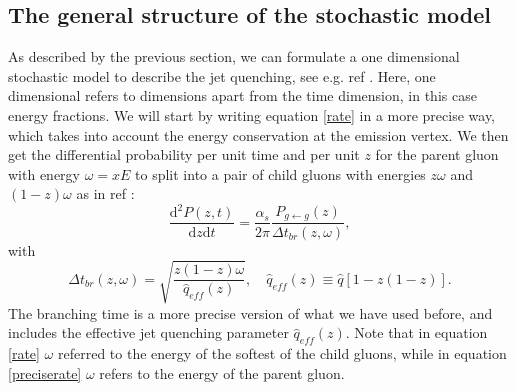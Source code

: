 \documentclass[a4paper,12pt]{article}
\numberwithin{equation}{section}
\begin{document}

\subsection{The general structure of the stochastic model}

As described by the previous section, we can formulate a one dimensional stochastic model to describe the jet quenching, see e.g. ref \cite{probabilistic}. Here, one dimensional refers to dimensions apart from the time dimension, in this case energy fractions. We will start by writing equation \eqref{rate} in a more precise way, which takes into account the energy conservation at the emission vertex. We then get the differential probability per unit time and per unit $z$ for the parent gluon with energy $\omega = xE$ to split into a pair of child gluons with energies $z\omega$ and $(1-z)\omega$ as in ref \cite{FisterIancu}:
\begin{equation}\label{preciserate}
\frac{\mathrm{d}^2 P(z,t)}{\mathrm{d}z\mathrm{d}t}=\frac{\alpha_s}{2 \pi}\frac{P_{g\leftarrow g}(z)}{\Delta t_{br}(z,\omega)},
\end{equation}
with
\begin{equation}
\Delta t_{br}(z,\omega)=\sqrt{\frac{z(1-z)\omega}{\hat{q}_{eff}(z)}}, \quad \hat{q}_{eff}(z) \equiv \hat{q}[1-z(1-z)].
\end{equation}
The branching time is a more precise version of what we have used before, and includes the effective jet quenching parameter $\hat{q}_{eff}(z)$. Note that in equation \eqref{rate} $\omega$ referred to the energy of the softest of the child gluons, while in equation \eqref{preciserate} $\omega$ refers to the energy of the parent gluon.
\end{document}
